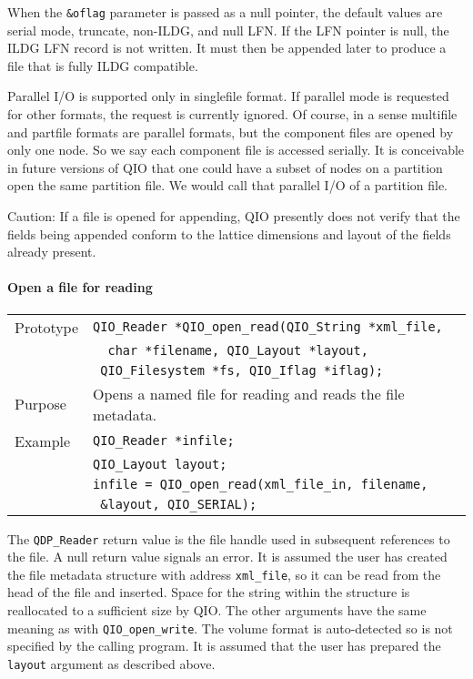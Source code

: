 \documentclass{article}
\newcommand{\QIOstring}{{\tt QIO\_String }}
\begin{document}
When the \verb|&oflag| parameter is passed as a null pointer, the
default values are serial mode, truncate, non-ILDG, and null LFN.  If
the LFN pointer is null, the ILDG LFN record is not written.  It must
then be appended later to produce a file that is fully ILDG compatible.

Parallel I/O is supported only in singlefile format.  If parallel mode
is requested for other formats, the request is currently ignored.  Of
course, in a sense multifile and partfile formats are parallel
formats, but the component files are opened by only one node.  So we
say each component file is accessed serially.  It is conceivable in
future versions of QIO that one could have a subset of nodes on a
partition open the same partition file.  We would call that parallel
I/O of a partition file.

Caution: If a file is opened for appending, QIO presently does not
verify that the fields being appended conform to the lattice
dimensions and layout of the fields already present.


\paragraph{Open a file for reading}

\begin{flushleft}
  \begin{tabular}{|l|l|}
  \hline
  Prototype      & \verb|QIO_Reader *QIO_open_read(|\QIOstring \verb|*xml_file,|\\
                 & \verb|  char *filename, QIO_Layout *layout, |\\
                 & \verb| QIO_Filesystem *fs, QIO_Iflag *iflag);| \\
  Purpose        & Opens a named file for reading and reads the file metadata. \\
\hline
  Example  & \verb|QIO_Reader *infile;| \\
           & \verb|QIO_Layout layout;| \\
           & \verb|infile = QIO_open_read(xml_file_in, filename,|\\
           & \verb| &layout, QIO_SERIAL);| \\
   \hline
 \end{tabular}
\end{flushleft}
%
The \verb|QDP_Reader| return value is the file handle used in
subsequent references to the file.  A null return value signals an
error.  It is assumed the user has created the file metadata structure
with address \verb|xml_file|, so it can be read from the head of the
file and inserted.  Space for the string within the structure is
reallocated to a sufficient size by QIO.  The other arguments have the
same meaning as with \verb|QIO_open_write|.  The volume format is
auto-detected so is not specified by the calling program.  It is
assumed that the user has prepared the \verb|layout| argument as
described above.
\end{document}
